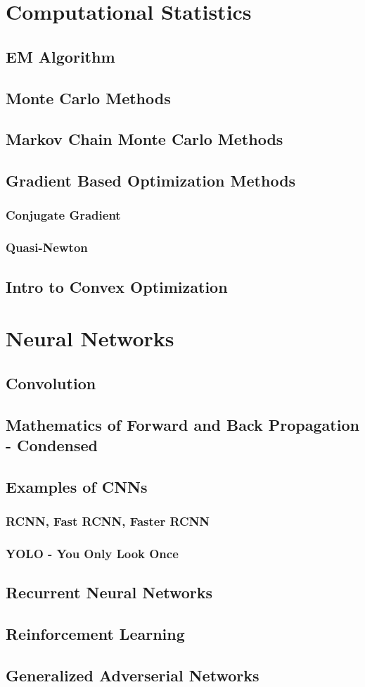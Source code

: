 \documentclass[12pt]{article}
\begin{document}
\newpage

\section{Computational Statistics}
    \subsection{EM Algorithm}
    \subsection{Monte Carlo Methods}
    \subsection{Markov Chain Monte Carlo Methods}
    \subsection{Gradient Based Optimization Methods}
        \subsubsection{Conjugate Gradient}
        \subsubsection{Quasi-Newton}
    \subsection{Intro to Convex Optimization}

\newpage

\section{Neural Networks} %
    \subsection{Convolution}
    \subsection{Mathematics of Forward and Back Propagation - Condensed}
    \subsection{Examples of CNNs}
        \subsubsection{RCNN, Fast RCNN, Faster RCNN}
        \subsubsection{YOLO - You Only Look Once}
    \subsection{Recurrent Neural Networks}
    \subsection{Reinforcement Learning} %
    \subsection{Generalized Adverserial Networks}
\end{document}
